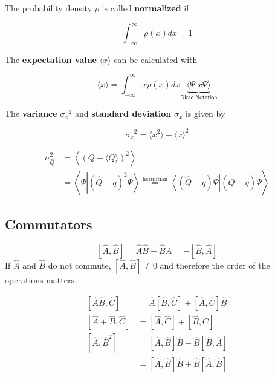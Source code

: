 The probability density $\rho$ is called \textbf{normalized} if

\begin{equation*}
    \int_{-\infty}^{\infty}\rho(x)dx = 1
\end{equation*}

The \textbf{expectation value} $\langle x \rangle$ can be calculated with

\begin{equation*}
    \langle x \rangle = \int_{-\infty}^{\infty} x\rho(x) dx \underbrace{{\langle \Psi|x\Psi\rangle} }_{\textsf{Dirac Notation}}
\end{equation*}

The \textbf{variance} ${\sigma_x}^2$ and \textbf{standard deviation} $\sigma_x$ is given by

\begin{equation*}
    {\sigma_x}^2 = \langle x^2 \rangle - {\langle x \rangle }^2
\end{equation*}

\begin{align*}
    \sigma_{\widehat{Q}}^{2} & =\left\langle{\left(Q-\langle Q\rangle\right)}^{2}\right\rangle                                                                                                                                    \\
                             & =\left\langle\Psi\left|{\left(\widehat{Q}-q\right)}^{2}\Psi\right\rangle\stackrel{\text{hermitian}}{=}\left\langle\left(\widehat{Q}-q\right)\Psi\right|\left(\widehat{Q}-q\right)\Psi\right\rangle
\end{align*}

\subsection{Commutators}\label{comm}

\noindent\begin{equation*}
    \left[\widehat{A},\widehat{B}\right] = \widehat{A}\widehat{B} - \widehat{B}\widehat{A} = -\left[\widehat{B},\widehat{A}\right]
\end{equation*}
If $\widehat{A}$ and $\widehat{B}$ do not commute, $\left[\widehat{A},\widehat{B}\right] \neq 0$ and therefore the order of the operations matters.

\newpar{}

\noindent\begin{align*}
    \left[\widehat{A}\widehat{B},\widehat{C}\right]  & =\widehat{A}\left[\widehat{B},\widehat{C}\right]+\left[\widehat{A},\widehat{C}\right]\widehat{B}     \\
    \left[\widehat{A}+\widehat{B},\widehat{C}\right] & = \left[\widehat{A},\widehat{C}\right]+\left[\widehat{B},\widehat{C}\right]                          \\
    \left[\widehat{A},\widehat{B}^2\right]           & = \left[\widehat{A},\widehat{B}\right] \widehat{B} - \widehat{B}\left[\widehat{B},\widehat{A}\right] \\
                                                     & = \left[\widehat{A},\widehat{B}\right] \widehat{B} + \widehat{B}\left[\widehat{A},\widehat{B}\right]
\end{align*}

